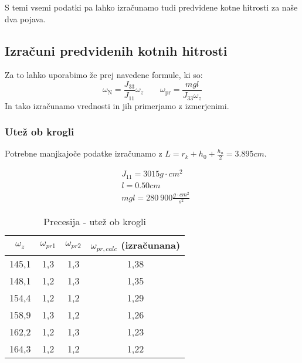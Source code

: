 \documentclass[11pt, a4paper]{article}
\theoremstyle{definition}
\theoremstyle{example}
\theoremstyle{izrek}
\begin{document}
S temi vsemi podatki pa lahko izračunamo tudi predvidene kotne hitrosti za naše dva pojava.

\subsection{Izračuni predvidenih kotnih hitrosti}
Za to lahko uporabimo že prej navedene formule, ki so: 
$$
\omega_{\mathrm{N}}=\frac{J_{33}}{J_{11}} \omega_{z} \qquad \omega_{\mathrm{pr}}=\frac{m g l}{J_{33} \omega_{z}}
$$
In tako izračunamo vrednosti in jih primerjamo z izmerjenimi. \\

\pagebreak
\subsubsection{Utež ob krogli}
Potrebne manjkajoče podatke izračunamo z $L = r_k + h_0 + \frac{h_u}{2} = 3.895 cm$.

\begin{align*}
	& J_{11} = 3015g\cdot cm^2\\ 
	& l = 0.50 cm\\
	& mgl = 280\: 900\frac{g\cdot cm^2}{s^2}
\end{align*}

\begin{table}[h]
	\centering
	\begin{tabular}{|c|c|c|c|}
		\hline
		\rule{0pt}{3ex}   
		$\omega_z$ & $\omega_{pr1}$\: & $\omega_{pr2}$\: & $\omega_{pr,calc}$\: (izračunana)\\
		\hline
		\hline
		145,1 &	1,3 &	1,3 &	1,38\\
		\hline
		148,1 &	1,2 &	1,3 &	1,35\\
		\hline
		154,4 &	1,2 &	1,2 &	1,29\\
		\hline
		158,9 &	1,3 &	1,2 &	1,26\\
		\hline
		162,2 &	1,2 &	1,3 &	1,23\\
		\hline
		164,3 &	1,2 &	1,2 &	1,22\\
		\hline
		
		
	\end{tabular}
\caption{Precesija - utež ob krogli}
\end{table}
\end{document}
